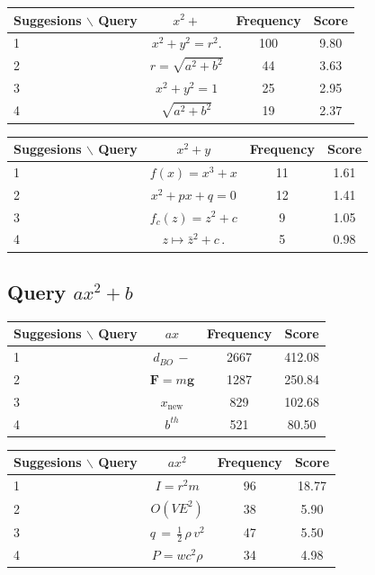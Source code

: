 \documentclass[12pt]{article} %
\begin{document}
\begin{center}
\begin{tabular}{lccc}
Suggesions $\backslash$ Query  & $x^2+ $ & Frequency & Score \\
\hline
 1 &  $ x^{2}+y^{2}=r^{2}.\! $ & 100 & 9.80 \\
 2 &  $ \scriptstyle r=\sqrt{a^{2}+b^{2}} $ & 44 & 3.63 \\
 3 &  $ x^{2}+y^{2}=1 $ & 25 & 2.95 \\
 4 &  $ \sqrt{a^{2}+b^{2}} $ & 19 & 2.37 \\
\end{tabular}
\end{center}


\begin{center}
\begin{tabular}{lccc}
Suggesions $\backslash$ Query  & $x^2 + y$ & Frequency & Score \\
\hline
 1 &  $ f(x)=x^{3}+x $ & 11 & 1.61 \\
 2 &  $ x^{2}+px+q=0 $ & 12 & 1.41 \\
 3 &  $ f_{c}(z)=z^{2}+c $ & 9 & 1.05 \\
 4 &  $ z\mapsto\bar{z}^{2}+c\,. $ & 5 & 0.98 \\
\end{tabular}
\end{center}


\subsection{Query $ax^2+b$}

\begin{center}
\begin{tabular}{lccc}
Suggesions $\backslash$ Query  & $ ax $ & Frequency & Score \\
\hline
 1 &  $ d_{BO}\!\,- $ & 2667 & 412.08 \\
 2 &  $ \mathbf{F}=m\mathbf{g} $ & 1287 & 250.84 \\
 3 &  $ x_{\mathrm{new}} $ & 829 & 102.68 \\
 4 &  $ b^{th} $ & 521 & 80.50 \\
\end{tabular}
\end{center}

\begin{center}
\begin{tabular}{lccc}
Suggesions $\backslash$ Query  & $ ax^2 $ & Frequency & Score \\
\hline
 1 &  $ I=r^{2}m $ & 96 & 18.77 \\
 2 &  $ O(VE^{2}) $ & 38 & 5.90 \\
 3 &  $ q\,=\,\tfrac{1}{2}\,\rho\,v^{2} $ & 47 & 5.50 \\
 4 &  $ P=wc^{2}\rho $ & 34 & 4.98 \\
\end{tabular}
\end{center}
\end{document}
